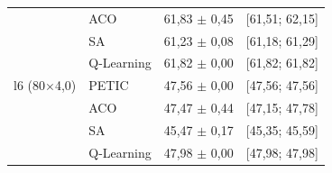 \begin{table}[htb]
\begin{tabular}{llcc}
         & ACO & 61,83 $\pm$ 0,45 & [61,51; 62,15] \\
         & SA & 61,23 $\pm$ 0,08 & [61,18; 61,29] \\
         & Q-Learning & 61,82 $\pm$ 0,00 & [61,82; 61,82] \\
        \hline
        l6 (80$\times$4,0) & PETIC & 47,56 $\pm$ 0,00 & [47,56; 47,56] \\
         & ACO & 47,47 $\pm$ 0,44 & [47,15; 47,78] \\
         & SA & 45,47 $\pm$ 0,17 & [45,35; 45,59] \\
         & Q-Learning & 47,98 $\pm$ 0,00 & [47,98; 47,98] \\
        \hline
    \end{tabular}
\end{table}
